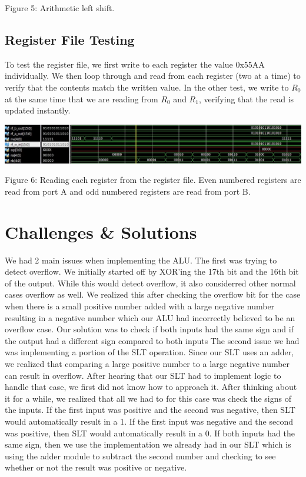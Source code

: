 \documentclass[11pt]{article}
\begin{document}
\hspace*{\fill}
Figure 5: Arithmetic left shift.
\hspace*{\fill}\newline

\subsection{Register File Testing}
To test the register file, we first write to each register the value 0x55AA individually. We then loop through and read from each register (two at a time) to verify that the contents match the written value. In the other test, we write to $R_0$ at the same time that we are reading from $R_0$ and $R_1$, verifying that the read is updated instantly. \\

{\centering
\includegraphics[scale=0.7]{fig6.jpg} \newline \par 
}

Figure 6: Reading each register from the register file. Even numbered registers are read from port A and odd numbered registers are read from port B.

\section{Challenges \& Solutions}
We had 2 main issues when implementing the ALU. The first was trying to detect overflow. We initially started off by XOR'ing the 17th bit and the 16th bit of the output. While this would detect overflow, it also considerred other normal cases overflow as well. We realized this after checking the overflow bit for the case when there is a small positive number added with a large negative number resulting in a negative number which our ALU had incorrectly believed to be an overflow case. Our solution was to check if both inputs had the same sign and if the output had a different sign compared to both inputs The second issue we had was implementing a portion of the SLT operation. Since our SLT uses an adder, we realized that comparing a large positive number to a large negative number can result in overflow. After hearing that our SLT had to implement logic to handle that case, we first did not know how to approach it. After thinking about it for a while, we realized that all we had to for this case was check the signs of the inputs. If the first input was positive and the second was negative, then SLT would automatically result in a 1. If the first input was negative and the second was positive, then SLT would automatically result in a 0. If both inputs had the same sign, then we use the implementation we already had in our SLT which is using the adder module to subtract the second number and checking to see whether or not the result was positive or negative.
\end{document}

